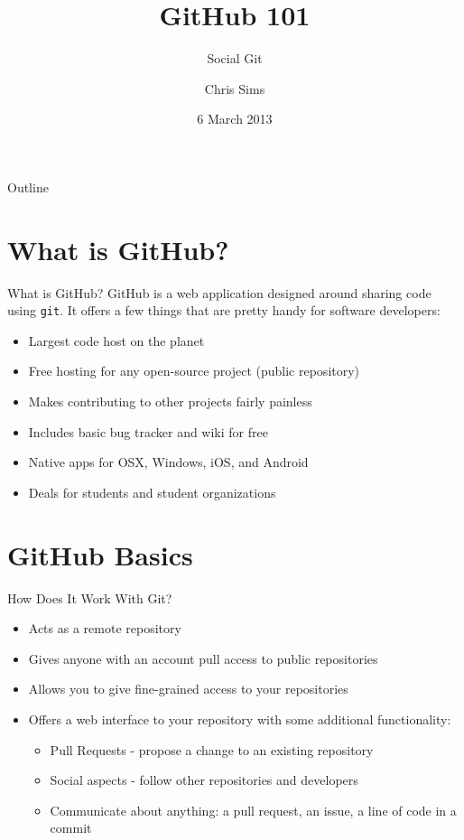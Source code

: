 \documentclass{beamer}
\title{GitHub 101}
\subtitle{Social Git}
\author{Chris Sims}
\institute{Engineering and Computer Science Interest Group \\
           URI Student ACM Chapter}
\date{6 March 2013}
\begin{document}
\frame{\titlepage}

\begin{frame}{Outline}
  \tableofcontents
\end{frame}


\section{What is GitHub?}
\begin{frame}{What is GitHub?}
 GitHub is a web application designed around sharing code using \texttt{git}.
 It offers a few things that are pretty handy for software developers:

 \begin{itemize}
   \item Largest code host on the planet
   \item Free hosting for any open-source project (public repository)
   \item Makes contributing to other projects fairly painless
   \item Includes basic bug tracker and wiki for free
   \item Native apps for OSX, Windows, iOS, and Android
   \item Deals for students and student organizations
 \end{itemize}

\end{frame}


\section{GitHub Basics}
\begin{frame}{How Does It Work With Git?}
  \begin{itemize}
    \item Acts as a remote repository
    \item Gives anyone with an account pull access to public repositories
    \item Allows you to give fine-grained access to your repositories
    \item Offers a web interface to your repository with some additional
    functionality:
    \begin{itemize}
      \item Pull Requests - propose a change to an existing repository
      \item Social aspects - follow other repositories and developers
      \item Communicate about anything: a pull request, an issue, a line of
            code in a commit
    \end{itemize}
  \end{itemize}
\end{frame}
\end{document}
